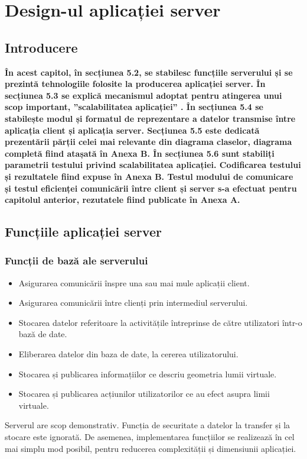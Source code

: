 \chapter{Design-ul aplicației server}
\section{Introducere}
\par \textbf{În acest capitol, în secțiunea 5.2, se stabilesc funcțiile serverului și se prezintă tehnologiile folosite la producerea aplicației server. În secțiunea 5.3 se explică mecanismul adoptat pentru atingerea unui scop important, ”scalabilitatea aplicației” . În secțiunea 5.4 se stabilește modul și formatul de reprezentare a datelor transmise între aplicația client și aplicația server. Secțiunea 5.5 este dedicată prezentării părții celei mai relevante din diagrama claselor, diagrama completă fiind atașată în Anexa B. În secțiunea 5.6 sunt stabiliți parametrii testului privind scalabilitatea aplicației. Codificarea testului și rezultatele fiind expuse în Anexa B. Testul modului de comunicare și testul eficienței comunicării între client și server s-a efectuat pentru capitolul anterior, rezutatele fiind publicate în Anexa A. } 

\section{Funcțiile aplicației server}
\subsection{Funcții de bază ale serverului} 
\begin{itemize}
\item Asigurarea comunicării înspre una sau mai mule aplicații client.
\item Asigurarea comunicării între clienți prin intermediul serverului.
\item Stocarea datelor referitoare la activitățile întreprinse de către utilizatori într-o bază de date.
\item Eliberarea datelor din baza de date, la cererea utilizatorului.
\item Stocarea și publicarea informațiilor ce descriu geometria lumii virtuale.
\item Stocarea și publicarea acțiunilor utilizatorilor ce au efect asupra limii virtuale.
\end{itemize}

\par Serverul are scop demonstrativ. Funcția de securitate a datelor la transfer și la stocare este ignorată. De asemenea, implementarea funcțiilor se realizează în cel mai simplu mod posibil, pentru reducerea complexității și dimensiunii aplicației.

